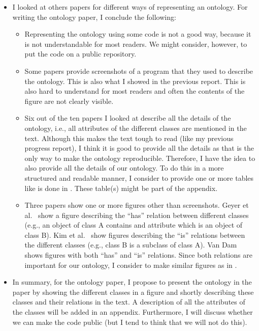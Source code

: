 \documentclass[10pt,final,a4paper,oneside,onecolumn]{article}
\begin{document}
\begin{itemize}
	\item I looked at others papers for different ways of representing an ontology. For writing the ontology paper, I conclude the following:
	\begin{itemize}
		\item Representing the ontology using some code \cite{chen2004soupa, chen2003ontology} is not a good way, because it is not understandable for most readers. We might consider, however, to put the code on a public repository.
		\item Some papers \cite{gkoutos2004mouse, lee2017location, matsokis2010plm} provide screenshots of a program that they used to describe the ontology. This is also what I showed in the previous report. This is also hard to understand for most readers and often the contents of the figure are not clearly visible. 
		\item Six \cite{kim2005security, chen2004soupa, chen2003ontology, golemati2007creating, matsokis2010plm, vanDamPhDThesis2009} out of the ten papers I looked at describe all the details of the ontology, i.e., all attributes of the different classes are mentioned in the text. Although this makes the text tough to read (like my previous progress report), I think it is good to provide all the details as that is the only way to make the ontology reproducible. Therefore, I have the idea to also provide all the details of our ontology. To do this in a more structured and readable manner, I consider to provide one or more tables like is done in \cite{golemati2007creating}. These table(s) might be part of the appendix.
		\item Three papers show one or more figures other than screenshots. Geyer et al.\ \cite{geyer2014} show a figure describing the ``has'' relation between different classes (e.g., an object of class A contains and attribute which is an object of class B). Kim et al.\ \cite{kim2005security} show figures describing the ``is'' relations between the different classes (e.g., class B is a subclass of class A). Van Dam \cite{vanDamPhDThesis2009} shows figures with both ``has'' and ``is'' relations. Since both relations are important for our ontology, I consider to make similar figures as in \cite{vanDamPhDThesis2009}. 
	\end{itemize}
	\item In summary, for the ontology paper, I propose to present the ontology in the paper by showing the different classes in a figure and shortly describing these classes and their relations in the text. A description of all the attributes of the classes will be added in an appendix. Furthermore, I will discuss whether we can make the code public (but I tend to think that we will not do this).

\end{itemize}
\end{document}
